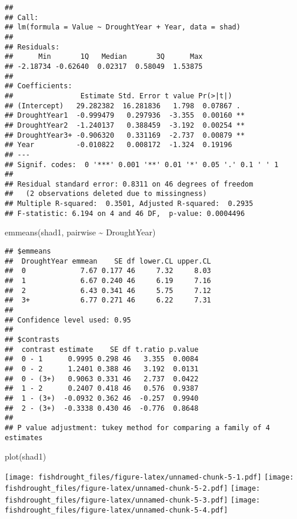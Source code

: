 \documentclass[
]{article}
\newenvironment{Shaded}{\begin{snugshade}}{\end{snugshade}}
\newcommand{\FunctionTok}[1]{\textcolor[rgb]{0.00,0.00,0.00}{#1}}
\newcommand{\NormalTok}[1]{#1}
\newcommand{\SpecialCharTok}[1]{\textcolor[rgb]{0.00,0.00,0.00}{#1}}
\begin{document}
\begin{verbatim}
## 
## Call:
## lm(formula = Value ~ DroughtYear + Year, data = shad)
## 
## Residuals:
##      Min       1Q   Median       3Q      Max 
## -2.18734 -0.62640  0.02317  0.58049  1.53875 
## 
## Coefficients:
##                Estimate Std. Error t value Pr(>|t|)   
## (Intercept)   29.282382  16.281836   1.798  0.07867 . 
## DroughtYear1  -0.999479   0.297936  -3.355  0.00160 **
## DroughtYear2  -1.240137   0.388459  -3.192  0.00254 **
## DroughtYear3+ -0.906320   0.331169  -2.737  0.00879 **
## Year          -0.010822   0.008172  -1.324  0.19196   
## ---
## Signif. codes:  0 '***' 0.001 '**' 0.01 '*' 0.05 '.' 0.1 ' ' 1
## 
## Residual standard error: 0.8311 on 46 degrees of freedom
##   (2 observations deleted due to missingness)
## Multiple R-squared:  0.3501, Adjusted R-squared:  0.2935 
## F-statistic: 6.194 on 4 and 46 DF,  p-value: 0.0004496
\end{verbatim}

\begin{Shaded}
\begin{Highlighting}[]
\FunctionTok{emmeans}\NormalTok{(shad1, pairwise }\SpecialCharTok{\textasciitilde{}}\NormalTok{ DroughtYear)}
\end{Highlighting}
\end{Shaded}

\begin{verbatim}
## $emmeans
##  DroughtYear emmean    SE df lower.CL upper.CL
##  0             7.67 0.177 46     7.32     8.03
##  1             6.67 0.240 46     6.19     7.16
##  2             6.43 0.341 46     5.75     7.12
##  3+            6.77 0.271 46     6.22     7.31
## 
## Confidence level used: 0.95 
## 
## $contrasts
##  contrast estimate    SE df t.ratio p.value
##  0 - 1      0.9995 0.298 46   3.355  0.0084
##  0 - 2      1.2401 0.388 46   3.192  0.0131
##  0 - (3+)   0.9063 0.331 46   2.737  0.0422
##  1 - 2      0.2407 0.418 46   0.576  0.9387
##  1 - (3+)  -0.0932 0.362 46  -0.257  0.9940
##  2 - (3+)  -0.3338 0.430 46  -0.776  0.8648
## 
## P value adjustment: tukey method for comparing a family of 4 estimates
\end{verbatim}

\begin{Shaded}
\begin{Highlighting}[]
\FunctionTok{plot}\NormalTok{(shad1)}
\end{Highlighting}
\end{Shaded}

\texttt{[image: fishdrought\_files/figure-latex/unnamed-chunk-5-1.pdf]}
\texttt{[image: fishdrought\_files/figure-latex/unnamed-chunk-5-2.pdf]}
\texttt{[image: fishdrought\_files/figure-latex/unnamed-chunk-5-3.pdf]}
\texttt{[image: fishdrought\_files/figure-latex/unnamed-chunk-5-4.pdf]}
\end{document}
